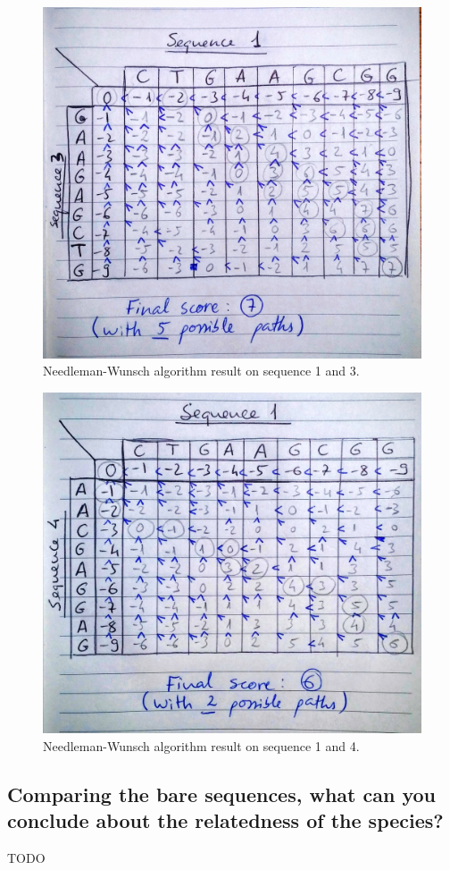 \begin{figure}[ht]
    \centering
    \includegraphics[width=0.6\linewidth]{res/needleman-wunsch-seq1-seq3.jpg}
    \caption{Needleman-Wunsch algorithm result on sequence 1 and 3.}
    \label{fig:needleman-wunsch-seq1-seq3}
\end{figure}

\begin{figure}[ht]
    \centering
    \includegraphics[width=0.6\linewidth]{res/needleman-wunsch-seq1-seq4.jpg}
    \caption{Needleman-Wunsch algorithm result on sequence 1 and 4.}
    \label{fig:needleman-wunsch-seq1-seq4}
\end{figure}

\clearpage


\subsection{Comparing the bare sequences, what can you conclude about the relatedness of the species?}

TODO

